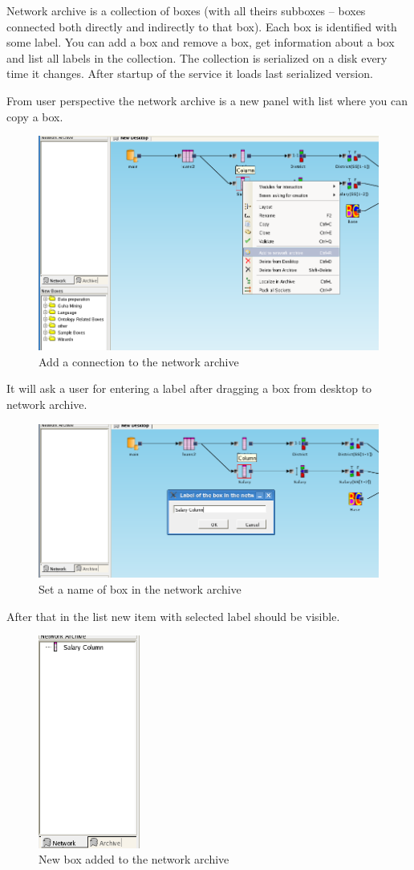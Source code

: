 \documentclass[a4paper,12pt]{book}
\begin{document}
Network archive is a collection of boxes (with all theirs subboxes -- boxes connected both directly and indirectly to that box). Each box is identified with some label. You can add a box and remove a box, get information about a box and list all labels in the collection. The collection is serialized on a disk every time it changes. After startup of the service it loads last serialized version.

From user perspective the network archive is a new panel with list where you can copy a box.
\begin{figure}
	\includegraphics[width=12cm]{add_to_network_archive}
	\caption{Add a connection to the network archive}
\end{figure}
It will ask a user for entering a label after dragging a box from desktop to network archive.
\begin{figure}
	\includegraphics[width=12cm]{set_name_of_box_in_network_archive}
	\caption{Set a name of box in the network archive}
\end{figure}
After that in the list new item with selected label should be visible.
\begin{figure}
	\includegraphics[height=7cm]{network_archive_box_added}
	\caption{New box added to the network archive}
\end{figure}
\end{document}
